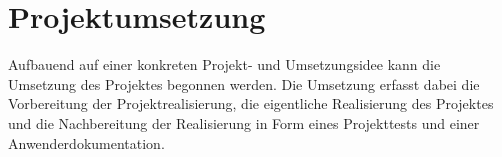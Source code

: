 \section{Projektumsetzung}
\label{sec:Projektumsetzung}

Aufbauend auf einer konkreten Projekt- und Umsetzungsidee kann die Umsetzung des Projektes begonnen werden.
Die Umsetzung erfasst dabei die Vorbereitung der Projektrealisierung, die eigentliche Realisierung des Projektes
und die Nachbereitung der Realisierung in Form eines Projekttests und einer Anwenderdokumentation. 






